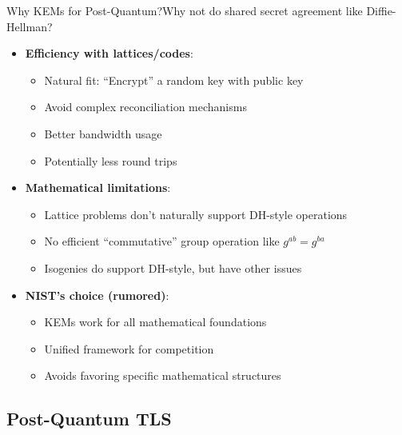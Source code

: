 \documentclass[aspectratio=169, lualatex, handout]{beamer}
\begin{document}
\begin{frame}{Why KEMs for Post-Quantum?}{Why not do shared secret agreement like Diffie-Hellman?}
	\begin{itemize}
		\item \textbf{Efficiency with lattices/codes}:
		      \begin{itemize}
			      \item Natural fit: ``Encrypt'' a random key with public key
			      \item Avoid complex reconciliation mechanisms
			      \item Better bandwidth usage
			      \item Potentially less round trips
		      \end{itemize}
		\item \textbf{Mathematical limitations}:
		      \begin{itemize}
			      \item Lattice problems don't naturally support DH-style operations
			      \item No efficient ``commutative'' group operation like $g^{ab} = g^{ba}$
			      \item Isogenies do support DH-style, but have other issues
		      \end{itemize}
		\item \textbf{NIST's choice (rumored)}:
		      \begin{itemize}
			      \item KEMs work for all mathematical foundations
			      \item Unified framework for competition
			      \item Avoids favoring specific mathematical structures
		      \end{itemize}
	\end{itemize}
\end{frame}

\subsection{Post-Quantum TLS}
\end{document}
